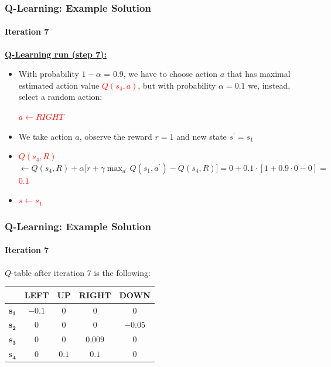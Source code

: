 \begin{frame}[<+->]
	\frametitle{Q-Learning: Example Solution}
	\framesubtitle{Iteration 7}
	
	\vspace{0.5cm}
	
	\textbf{\underline{Q-Learning run (step 7):}}
	
	\begin{itemize}
		\item With probability $ 1 - \alpha $ = 0.9, we have to choose action $ a $ that
			  has maximal estimated action value \textcolor{red}{$ Q(s_4,a) $}, but with
			  probability $ \alpha = 0.1 $ we, instead, select a random action:
			  
			  \begin{center}
				  \textcolor{red}{$ a \leftarrow RIGHT $}
			  \end{center}
		\item We take action $ a $, observe the reward $ r = 1 $ and new state $
			  s^\prime = s_1 $
		\item \textcolor{red}{$ Q(s_4,R) $} $ \leftarrow Q(s_4,R) + \alpha \Big [ r + \gamma \max_{a^\prime} Q(s_1,a^\prime) - Q(s_4,R) \Big ] = 0 + 0.1 \cdot [ 1 + 0.9 \cdot 0 - 0 ] = $ \textcolor{red}{$ 0.1 $}
		\item \textcolor{red}{$ s \leftarrow s_1 $}
	\end{itemize}
\end{frame}

\begin{frame}
	\frametitle{Q-Learning: Example Solution}
	\framesubtitle{Iteration 7}
	
	\Large
	
	$ Q $-table after iteration 7 is the following:
	
	\begin{table}[!h]
		\begin{tabular}{c|c|c|c|c|}
			\cline{2-5}
			& \textbf{LEFT} & \textbf{UP} & \textbf{RIGHT} & \textbf{DOWN} \\ \hline
			\multicolumn{1}{|c|}{$ \mathbf{s_1} $} & $ -0.1 $ & $ 0 $ & $ 0 $ & $ 0 $\\ \hline
			\multicolumn{1}{|c|}{$ \mathbf{s_2} $} & $ 0 $ & $ 0 $ & $ 0 $ & $ -0.05 $\\ \hline
			\multicolumn{1}{|c|}{$ \mathbf{s_3} $} & $ 0 $ & $ 0 $ & $ 0.009 $ & $ 0 $\\ \hline
			\multicolumn{1}{|c|}{$ \mathbf{s_4} $} & $ 0 $ & $ 0.1 $ & $ 0.1 $ & $ 0 $\\ \hline
		\end{tabular}
	\end{table}
\end{frame}

